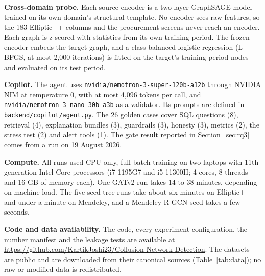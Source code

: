 \documentclass[conference]{IEEEtran}
\begin{document}
\textbf{Cross-domain probe.} Each source encoder is a two-layer GraphSAGE model
trained on its own domain's structural template. No encoder sees raw features,
so the 183 Elliptic++ columns and the procurement screens never reach an
encoder. Each graph is z-scored with statistics from its own training period.
The frozen encoder embeds the target graph, and a class-balanced logistic
regression (L-BFGS, at most 2,000 iterations) is fitted on the target's
training-period nodes and evaluated on its test period.

\textbf{Copilot.} The agent uses \texttt{nvidia/nemotron-3-super-120b-a12b}
through NVIDIA NIM at temperature 0, with at most 4,096 tokens per call, and
\texttt{nvidia/nemotron-3-nano-30b-a3b} as a validator. Its prompts are defined
in \texttt{backend/copilot/agent.py}. The 26 golden cases cover SQL questions
(8), retrieval (4), explanation bundles (3), guardrails (3), honesty (3),
metrics (2), the stress test (2) and alert tools (1). The gate result reported
in Section~\ref{sec:rq3} comes from a run on 19 August 2026.

\textbf{Compute.} All runs used CPU-only, full-batch training on two laptops
with 11th-generation Intel Core processors (i7-1195G7 and i5-11300H; 4 cores, 8
threads and 16 GB of memory each). One GATv2 run takes 14 to 38 minutes,
depending on machine load. The five-seed tree runs take about six minutes on
Elliptic++ and under a minute on Mendeley, and a Mendeley R-GCN seed takes a few
seconds.

\textbf{Code and data availability.} The code, every experiment configuration,
the number manifest and the leakage tests are available at
\url{https://github.com/KartikJoshi23/Collusion-Network-Detection}. The
datasets are public and are downloaded from their canonical sources
(Table~\ref{tab:data}); no raw or modified data is redistributed.

\balance
\end{document}

